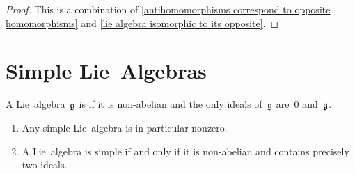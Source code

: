 \begin{proof}
  This is a combination of \cref{antihomomorphisms correspond to opposite homomorphisms} and \cref{lie algebra isomorphic to its opposite}.
\end{proof}





\section{Simple Lie~Algebras}


\begin{definition}
 A Lie~algebra~$\mathfrak{g}$ is  if it is non-abelian and the only ideals of~$\mathfrak{g}$ are~$0$ and~$\mathfrak{g}$.
\end{definition}


\begin{remark}
  \leavevmode
  \begin{enumerate}
    \item
      Any simple Lie~algebra is in particular nonzero.
    \item
      A Lie~algebra is simple if and only if it is non-abelian and contains precisely two ideals.
  \end{enumerate}
\end{remark}


